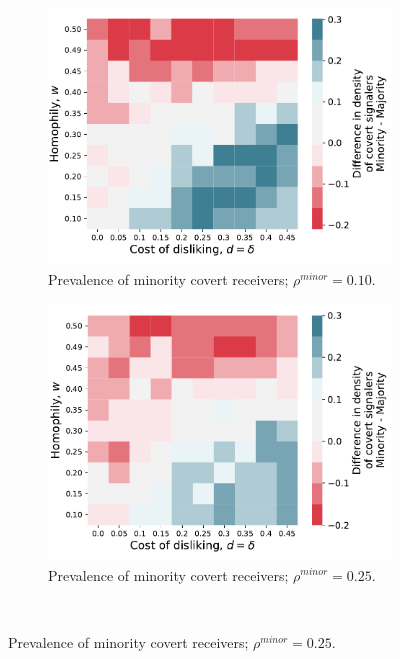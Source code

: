 \documentclass[11pt,letterpaper]{article}
\begin{document}
\begin{figure}[H]
  \centering
  \begin{subfigure}{0.4\textwidth}
    \centering
    \includegraphics[width=\textwidth]{prelim/Figures/covert_signalers_diff_010.pdf}
    \caption{Prevalence of minority covert receivers; $\rho^{minor} = 0.10$.}
  \end{subfigure}
  \hfill
  \begin{subfigure}{0.4\textwidth}
    \centering
    \includegraphics[width=\textwidth]{prelim/Figures/covert_signalers_diff_025.pdf}
    \caption{Prevalence of minority covert receivers; $\rho^{minor} = 0.25$.}
  \end{subfigure} \\[.25in]

\end{figure}
\end{document}

